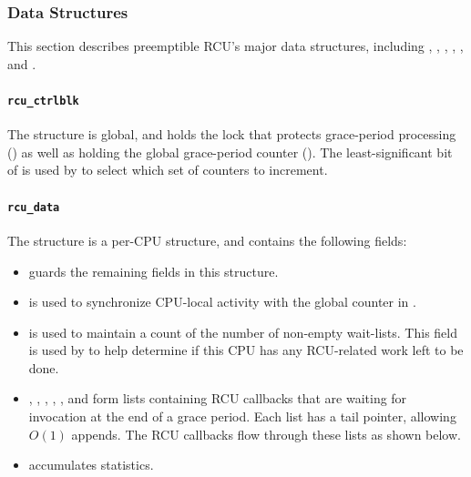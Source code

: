\subsubsection{Data Structures}
\label{app:rcuimpl:Data Structures}

This section describes preemptible RCU's major data structures, including
, , ,
, , and
.

\paragraph{{\tt rcu\_ctrlblk}}
\label{app:rcuimpl:rcu_ctrlblk}

The  structure is global, and holds the lock
that protects grace-period processing () as well
as holding the global grace-period counter ().
The least-significant bit of  is used by
 to select which set of counters to increment.

\paragraph{{\tt rcu\_data}}
\label{app:rcuimpl:rcu_data}

The  structure is a per-CPU structure, and
contains the following fields:

\begin{itemize}
\item	{} guards the remaining fields in this structure.
\item	{} is used to synchronize CPU-local
	activity with the global counter in .
\item	{} is used to maintain a count of the
	number of non-empty wait-lists.
	This field is used by  to help determine
	if this CPU has any RCU-related work left to be done.
\item	{}, , ,
	, , and
	 form lists containing
	RCU callbacks that are waiting for invocation at the end
	of a grace period.
	Each list has a tail pointer, allowing $O\left(1\right)$ appends.
	The RCU callbacks flow through these lists as shown below.
\item	{} accumulates statistics.
\end{itemize}

